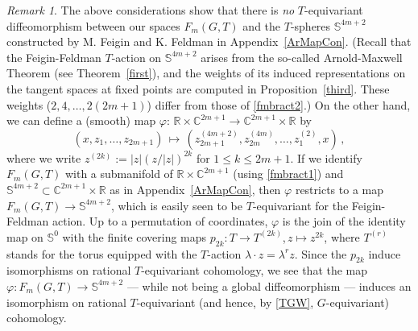 \documentclass[11pt]{amsart}
\theoremstyle{definition}
\theoremstyle{remark}
\newtheorem{remark}[theorem]{Remark}
\numberwithin{equation}{section}
\newcommand{\la}{\label}
\def\bS{\mathbb S}
\def\c{\mathbb{C}}
\begin{document}
\begin{remark}
The above considerations show that there is {\it no} $T$-equivariant diffeomorphism between our spaces $F_m(G,T)$ and the $T$-spheres $\bS^{4m+2}$ constructed by M. Feigin and K. Feldman in Appendix~\ref{ArMapCon}. (Recall that the Feigin-Feldman $T$-action on $\bS^{4m+2}$  arises from the so-called Arnold-Maxwell Theorem (see Theorem~\ref{first}), 
and the weights of its induced representations on the tangent spaces at fixed points are computed in Proposition~\ref{third}. These weights ($2,4,\ldots, 2(2m+1)$) differ from those of \eqref{fmbract2}.) On the other hand, we can define a (smooth) map 
$\varphi:\, \mathbb{R} \times \c^{2m+1} \to  \c^{2m+1} \times \mathbb{R}$ by 
%
\begin{equation} 
\la{fmbract4}
(x,z_1,\ldots,z_{2m+1}) \,\mapsto\, (z_{2m+1}^{(4m+2)},z_{2m}^{(4m)},\ldots, z_1^{(2)},x)\,,  \end{equation}
%
where we write $ z^{(2k)} := |z|(z/|z|)^{2k} $ for $ 1 \leqslant k \leqslant 2m+1$. 
If we identify $ F_m(G,T) $ with a submanifold of $ \mathbb{R} \times \c^{2m+1} $ (using \eqref{fmbract1}) and $ \bS^{4m+2} \subset \c^{2m+1} \times \mathbb{R} $ as in Appendix~\ref{ArMapCon}, then $\varphi$ restricts to a map $ F_m(G,T) \to \bS^{4m+2}  $, which is easily seen to be $T$-equivariant for the 
Feigin-Feldman action.  Up to a permutation of coordinates, $\varphi$ is the join of the identity map on $\bS^0$ with the finite covering maps $p_{2k}: T \to T^{(2k)}$,$\, z \mapsto z^{2k}$, where $T^{(r)}$ stands for the torus equipped with the $T$-action $\lambda \cdot z = \lambda^r z$. Since the $p_{2k}$ induce isomorphisms on rational $T$-equivariant cohomology, we see that the map $ \varphi: F_m(G,T) \to \bS^{4m+2}  $ --- while not being a global diffeomorphism --- induces an isomorphism on rational $T$-equivariant (and hence, by \eqref{TGW}, $G$-equivariant) cohomology.     
\end{remark}
\end{document}
